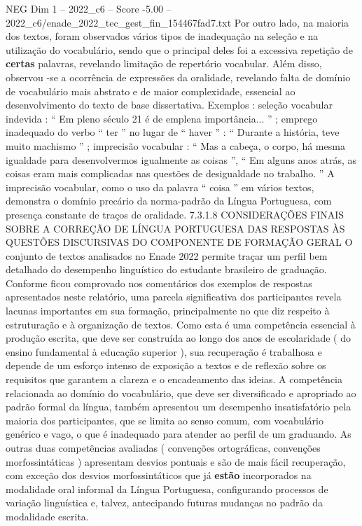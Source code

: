 \begin{textsample}{NEG Dim 1 – 2022\_c6 – Score -5.00 – 2022\_c6/enade\_2022\_tec\_gest\_fin\_154467fad7.txt}
Por outro lado, na maioria dos textos, foram observados vários tipos de inadequação na seleção e na utilização do vocabulário, sendo que o principal deles foi a excessiva repetição de \textbf{certas} palavras, revelando limitação de repertório vocabular.
Além disso, observou -se a ocorrência de expressões da oralidade, revelando falta de domínio de vocabulário mais abstrato e de maior complexidade, essencial ao desenvolvimento do texto de base dissertativa.
Exemplos : seleção vocabular indevida : “ Em pleno século 21 é de emplena importância... ” ; emprego inadequado do verbo “ ter ” no lugar de “ haver ” : “ Durante a história, teve muito machismo ” ; imprecisão vocabular : “ Mas a cabeça, o corpo, há mesma igualdade para desenvolvermos igualmente as coisas ”, “ Em alguns anos atrás, as coisas eram mais complicadas nas questões de desigualdade no trabalho. ” A imprecisão vocabular, como o uso da palavra “ coisa ” em vários textos, demonstra o domínio precário da norma-padrão da Língua Portuguesa, com presença constante de traços de oralidade. 7.3.1.8 CONSIDERAÇÕES FINAIS SOBRE A CORREÇÃO DE LÍNGUA PORTUGUESA DAS RESPOSTAS ÀS QUESTÕES DISCURSIVAS DO COMPONENTE DE FORMAÇÃO GERAL O conjunto de textos analisados no Enade 2022 permite traçar um perfil bem detalhado do desempenho linguístico do estudante brasileiro de graduação.
Conforme ficou comprovado nos comentários dos exemplos de respostas apresentados neste relatório, uma parcela significativa dos participantes revela lacunas importantes em sua formação, principalmente no que diz respeito à estruturação e à organização de textos.
Como esta é uma competência essencial à produção escrita, que deve ser construída ao longo dos anos de escolaridade ( do ensino fundamental à educação superior ), sua recuperação é trabalhosa e depende de um esforço intenso de exposição a textos e de reflexão sobre os requisitos que garantem a clareza e o encadeamento das ideias.
A competência relacionada ao domínio do vocabulário, que deve ser diversificado e apropriado ao padrão formal da língua, também apresentou um desempenho insatisfatório pela maioria dos participantes, que se limita ao senso comum, com vocabulário genérico e vago, o que é inadequado para atender ao perfil de um graduando.
As outras duas competências avaliadas ( convenções ortográficas, convenções morfossintáticas ) apresentam desvios pontuais e são de mais fácil recuperação, com exceção dos desvios morfossintáticos que já \textbf{estão} incorporados na modalidade oral informal da Língua Portuguesa, configurando processos de variação linguística e, talvez, antecipando futuras mudanças no padrão da modalidade escrita.

\end{textsample}
